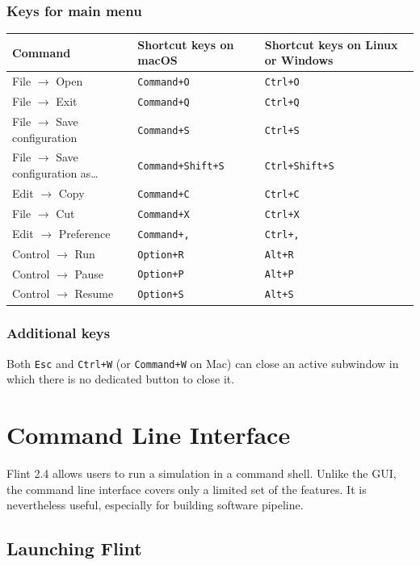 \documentclass[a4paper,10pt]{report}
\begin{document}
\subsection{Keys for main menu}
\label{sec:org5b3a563}
\begin{center}
\begin{tabular}{l||l|l}
Command & Shortcut keys on macOS & Shortcut keys on Linux or Windows\\
\hline
File \(\to\) Open & \texttt{Command+O} & \texttt{Ctrl+O}\\
File \(\to\) Exit & \texttt{Command+Q} & \texttt{Ctrl+Q}\\
File \(\to\) Save configuration & \texttt{Command+S} & \texttt{Ctrl+S}\\
File \(\to\) Save configuration as\ldots{} & \texttt{Command+Shift+S} & \texttt{Ctrl+Shift+S}\\
Edit \(\to\) Copy & \texttt{Command+C} & \texttt{Ctrl+C}\\
File \(\to\) Cut & \texttt{Command+X} & \texttt{Ctrl+X}\\
Edit \(\to\) Preference & \texttt{Command+,} & \texttt{Ctrl+,}\\
Control \(\to\) Run & \texttt{Option+R} & \texttt{Alt+R}\\
Control \(\to\) Pause & \texttt{Option+P} & \texttt{Alt+P}\\
Control \(\to\) Resume & \texttt{Option+S} & \texttt{Alt+S}\\
\end{tabular}
\end{center}

\subsection{Additional keys}
\label{sec:orgfd0fcb1}
Both \texttt{Esc} and \texttt{Ctrl+W} (or \texttt{Command+W} on Mac) can close an active
subwindow in which there is no dedicated button to close it.

\chapter{Command Line Interface}
\label{sec:orge0e3e20}
Flint 2.4 allows users to run a simulation in a command shell.
Unlike the GUI, the command line interface covers only a limited set of
the features. It is nevertheless useful, especially for building software pipeline.

\section{Launching Flint}
\label{sec:org7ee1fe6}
\end{document}
